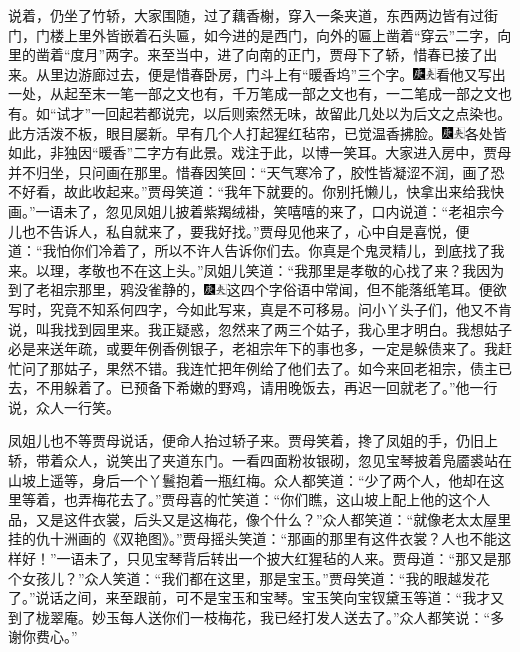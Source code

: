 说着，仍坐了竹轿，大家围随，过了藕香榭，穿入一条夹道，东西两边皆有过街门，门楼上里外皆嵌着石头匾，如今进的是西门，向外的匾上凿着“穿云”二字，向里的凿着“度月”两字。来至当中，进了向南的正门，贾母下了轿，惜春已接了出来。从里边游廊过去，便是惜春卧房，门斗上有“暖香坞”三个字。{\includegraphics[width=3mm]{../Images/00004}\includegraphics[width=3mm]{../Images/00012}\footnotesize \kaishu 看他又写出一处，从起至末一笔一部之文也有，千万笔成一部之文也有，一二笔成一部之文也有。如“试才”一回起若都说完，以后则索然无味，故留此几处以为后文之点染也。此方活泼不板，眼目屡新。}早有几个人打起猩红毡帘，已觉温香拂脸。{\includegraphics[width=3mm]{../Images/00004}\includegraphics[width=3mm]{../Images/00012}\footnotesize \kaishu 各处皆如此，非独因“暖香”二字方有此景。戏注于此，以博一笑耳。}大家进入房中，贾母并不归坐，只问画在那里。惜春因笑回：“天气寒冷了，胶性皆凝涩不润，画了恐不好看，故此收起来。”贾母笑道：“我年下就要的。你别托懒儿，快拿出来给我快画。”一语未了，忽见凤姐儿披着紫羯绒褂，笑嘻嘻的来了，口内说道：“老祖宗今儿也不告诉人，私自就来了，要我好找。”贾母见他来了，心中自是喜悦，便道：“我怕你们冷着了，所以不许人告诉你们去。你真是个鬼灵精儿，到底找了我来。以理，孝敬也不在这上头。”凤姐儿笑道：“我那里是孝敬的心找了来？我因为到了老祖宗那里，鸦没雀静的，{\includegraphics[width=3mm]{../Images/00004}\includegraphics[width=3mm]{../Images/00012}\footnotesize \kaishu 这四个字俗语中常闻，但不能落纸笔耳。便欲写时，究竟不知系何四字，今如此写来，真是不可移易。}问小丫头子们，他又不肯说，叫我找到园里来。我正疑惑，忽然来了两三个姑子，我心里才明白。我想姑子必是来送年疏，或要年例香例银子，老祖宗年下的事也多，一定是躲债来了。我赶忙问了那姑子，果然不错。我连忙把年例给了他们去了。如今来回老祖宗，债主已去，不用躲着了。已预备下希嫩的野鸡，请用晚饭去，再迟一回就老了。”他一行说，众人一行笑。

凤姐儿也不等贾母说话，便命人抬过轿子来。贾母笑着，搀了凤姐的手，仍旧上轿，带着众人，说笑出了夹道东门。一看四面粉妆银砌，忽见宝琴披着凫靥裘站在山坡上遥等，身后一个丫鬟抱着一瓶红梅。众人都笑道：“少了两个人，他却在这里等着，也弄梅花去了。”贾母喜的忙笑道：“你们瞧，这山坡上配上他的这个人品，又是这件衣裳，后头又是这梅花，像个什么？”众人都笑道：“就像老太太屋里挂的仇十洲画的《双艳图》。”贾母摇头笑道：“那画的那里有这件衣裳？人也不能这样好！”一语未了，只见宝琴背后转出一个披大红猩毡的人来。贾母道：“那又是那个女孩儿？”众人笑道：“我们都在这里，那是宝玉。”贾母笑道：“我的眼越发花了。”说话之间，来至跟前，可不是宝玉和宝琴。宝玉笑向宝钗黛玉等道：“我才又到了栊翠庵。妙玉每人送你们一枝梅花，我已经打发人送去了。”众人都笑说：“多谢你费心。”

